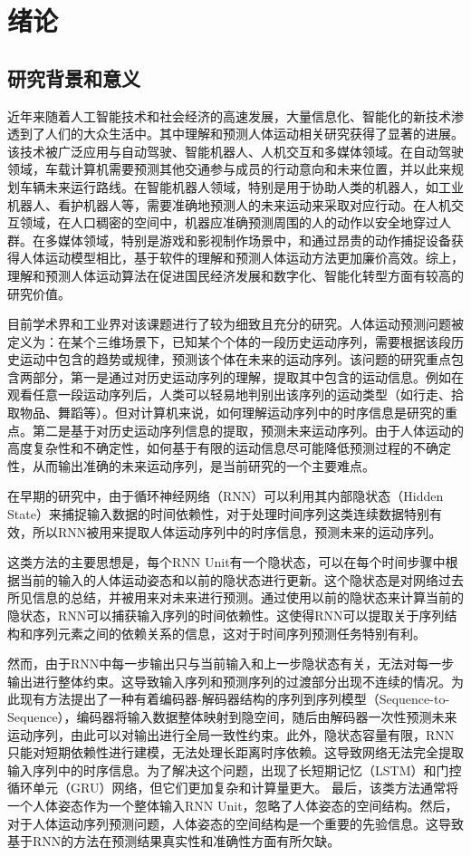\chapter{绪论}
%
\section{研究背景和意义}
近年来随着人工智能技术和社会经济的高速发展，大量信息化、智能化的新技术渗透到了人们的大众生活中。其中理解和预测人体运动相关研究获得了显著的进展。该技术被广泛应用与自动驾驶、智能机器人、人机交互和多媒体领域。在自动驾驶领域，车载计算机需要预测其他交通参与成员的行动意向和未来位置，并以此来规划车辆未来运行路线。在智能机器人领域，特别是用于协助人类的机器人，如工业机器人、看护机器人等，需要准确地预测人的未来运动来采取对应行动。在人机交互领域，在人口稠密的空间中，机器应准确预测周围的人的动作以安全地穿过人群。在多媒体领域，特别是游戏和影视制作场景中，和通过昂贵的动作捕捉设备获得人体运动模型相比，基于软件的理解和预测人体运动方法更加廉价高效。综上，理解和预测人体运动算法在促进国民经济发展和数字化、智能化转型方面有较高的研究价值。

目前学术界和工业界对该课题进行了较为细致且充分的研究。人体运动预测问题被定义为：在某个三维场景下，已知某个个体的一段历史运动序列，需要根据该段历史运动中包含的趋势或规律，预测该个体在未来的运动序列。该问题的研究重点包含两部分，第一是通过对历史运动序列的理解，提取其中包含的运动信息。例如在观看任意一段运动序列后，人类可以轻易地判别出该序列的运动类型（如行走、拾取物品、舞蹈等）。但对计算机来说，如何理解运动序列中的时序信息是研究的重点。第二是基于对历史运动序列信息的提取，预测未来运动序列。由于人体运动的高度复杂性和不确定性，如何基于有限的运动信息尽可能降低预测过程的不确定性，从而输出准确的未来运动序列，是当前研究的一个主要难点。

在早期的研究中，由于循环神经网络（RNN\cite{zaremba2014recurrent}）可以利用其内部隐状态（Hidden State）来捕捉输入数据的时间依赖性，对于处理时间序列这类连续数据特别有效，所以RNN被用来提取人体运动序列中的时序信息，预测未来的运动序列。

这类方法的主要思想是，每个RNN Unit有一个隐状态，可以在每个时间步骤中根据当前的输入的人体运动姿态和以前的隐状态进行更新。这个隐状态是对网络过去所见信息的总结，并被用来对未来进行预测。通过使用以前的隐状态来计算当前的隐状态，RNN可以捕获输入序列的时间依赖性。这使得RNN可以提取关于序列结构和序列元素之间的依赖关系的信息，这对于时间序列预测任务特别有利。

然而，由于RNN中每一步输出只与当前输入和上一步隐状态有关，无法对每一步输出进行整体约束。这导致输入序列和预测序列的过渡部分出现不连续的情况。为此现有方法提出了一种有着编码器-解码器结构的序列到序列模型（Sequence-to-Sequence），编码器将输入数据整体映射到隐空间，随后由解码器一次性预测未来运动序列，由此可以对输出进行全局一致性约束。此外，隐状态容量有限，RNN只能对短期依赖性进行建模，无法处理长距离时序依赖。这导致网络无法完全提取输入序列中的时序信息。为了解决这个问题，出现了长短期记忆（LSTM\cite{shi2015convolutional}）和门控循环单元（GRU\cite{cho2014learning}）网络，但它们更加复杂和计算量更大。
最后，该类方法通常将一个人体姿态作为一个整体输入RNN Unit，忽略了人体姿态的空间结构。然后，对于人体运动序列预测问题，人体姿态的空间结构是一个重要的先验信息。这导致基于RNN的方法在预测结果真实性和准确性方面有所欠缺。

